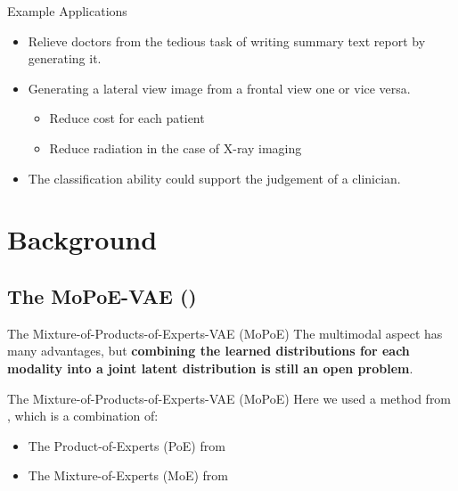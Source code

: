 \documentclass[aspectratio=169]{beamer}
\begin{document}
    \begin{frame}{Example Applications}
        \begin{itemize}
            \pause
            \item Relieve doctors from the tedious task of writing summary text report by generating it.
            \pause
            \item Generating a lateral view image from a frontal view one or vice versa.
            \pause
            \begin{itemize}
                \item Reduce cost for each patient
                \item Reduce radiation in the case of X-ray imaging
            \end{itemize}
            \pause
            \item The classification ability could support the judgement of a clinician.
        \end{itemize}

    \end{frame}


    \section{Background}

    \subsection{The MoPoE-VAE (\cite{thomas_gener-ELBO})}
    \begin{frame}{The Mixture-of-Products-of-Experts-VAE (MoPoE)}
        The multimodal aspect has many advantages, but \textbf{combining the learned distributions for each modality into a joint latent distribution is still an open problem}.
    \end{frame}

    \begin{frame}{The Mixture-of-Products-of-Experts-VAE (MoPoE)}
        Here we used a method from \cite{thomas_gener-ELBO}, which is a combination of:
        \begin{itemize}
            \item The Product-of-Experts (PoE) from \cite{wu2018multimodal}
            \item The Mixture-of-Experts (MoE) from \cite{shi2019variational}
        \end{itemize}
    \end{frame}
\end{document}
